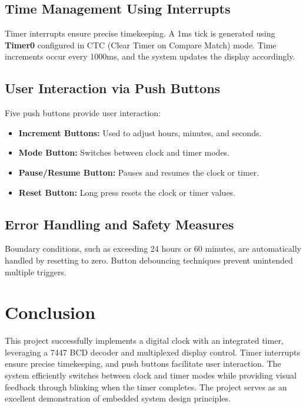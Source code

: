 \documentclass[a4paper,12pt]{article}
\begin{document}
\subsection{Time Management Using Interrupts}
Timer interrupts ensure precise timekeeping. A 1ms tick is generated using \textbf{Timer0} configured in CTC (Clear Timer on Compare Match) mode. Time increments occur every 1000ms, and the system updates the display accordingly.

\subsection{User Interaction via Push Buttons}
Five push buttons provide user interaction:
\begin{itemize}
    \item \textbf{Increment Buttons:} Used to adjust hours, minutes, and seconds.
    \item \textbf{Mode Button:} Switches between clock and timer modes.
    \item \textbf{Pause/Resume Button:} Pauses and resumes the clock or timer.
    \item \textbf{Reset Button:} Long press resets the clock or timer values.
\end{itemize}

\subsection{Error Handling and Safety Measures}
Boundary conditions, such as exceeding 24 hours or 60 minutes, are automatically handled by resetting to zero. Button debouncing techniques prevent unintended multiple triggers.

\section{Conclusion}
This project successfully implements a digital clock with an integrated timer, leveraging a 7447 BCD decoder and multiplexed display control. Timer interrupts ensure precise timekeeping, and push buttons facilitate user interaction. The system efficiently switches between clock and timer modes while providing visual feedback through blinking when the timer completes. The project serves as an excellent demonstration of embedded system design principles.
\end{document}
